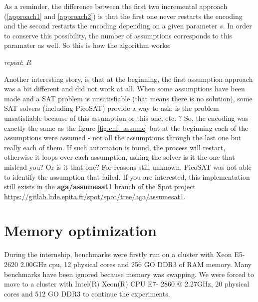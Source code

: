 \noindent As a reminder, the difference between the first two incremental approach
(\ref{approach1} and \ref{approach2}) is that the first one never restarts the encoding and the second
restarts the encoding depending on a given parameter $s$. In order to
conserve this possibility, the number of assumptions corresponds to this paramater as well. So this is
how the algorithm works:\\

\begin{algorithm}[H]
 \caption{}
 \label{assume}
 \begin{algorithmic}[1]
   \BState \emph{repeat}:
    \Return $R$\EndIf
   \Else
   \EndIf
  \EndProcedure
 \end{algorithmic}
\end{algorithm}

Another interesting story, is that at the beginning, the first assumption
approach was a bit different and did not work at all. When some assumptions have been made and a SAT
problem is unsatisfiable (that means there is no solution), some SAT solvers (including PicoSAT) provide a
way to ask: is the problem unsatisfiable because of this assumption or this one, etc. ?
So, the encoding was exactly the same as the figure \ref{fig:cnf_assume} but at the beginning each of
the assumptions were assumed - not all the assumptions through the last one but really each of them.
If such automaton is found, the process will restart, otherwise it loops over each assumption, asking the
solver is it the one that mislead you? Or is it that one? For reasons still unknown, PicoSAT was not able
to identify the assumption that failed. If you are interested, this implementation still exists in the
\textbf{aga/assumesat1} branch of the Spot project
\url{https://gitlab.lrde.epita.fr/spot/spot/tree/aga/assumesat1}.

\section{Memory optimization}
During the internship, benchmarks were firstly run on a cluster with Xeon E5-2620 2.00GHz cpu, 12
physical cores and 256 GO DDR3 of RAM memory. Many benchmarks have been ignored because memory was
swapping. We were forced to move to a cluster with Intel(R) Xeon(R) CPU E7- 2860  @ 2.27GHz, 20 physical
cores and 512 GO DDR3 to continue the experiments.\\

